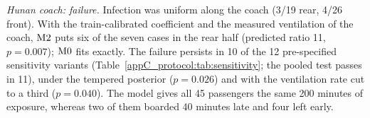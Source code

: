 \emph{Hunan coach: failure.} Infection was uniform along the coach (3/19 rear, 4/26 front). With the
train-calibrated coefficient and the measured ventilation of the coach, $\mathrm{M2}$ puts six of the seven cases in
the rear half (predicted ratio 11, $p=0.007$); $\mathrm{M0}$ fits exactly. The failure persists in 10 of the 12
pre-specified sensitivity variants (Table~\ref{appC_protocol:tab:sensitivity}; the pooled test passes in 11),
under the tempered posterior
($p=0.026$) and with the ventilation rate cut to a third ($p=0.040$). The model gives all 45 passengers the
same 200 minutes of exposure, whereas two of them boarded 40 minutes late and four left early.

